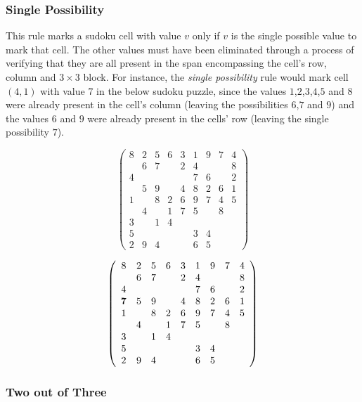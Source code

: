 \documentclass{article}
\begin{document}
\subsubsection{Single Possibility}

This rule marks a sudoku cell with value $v$ only if $v$ is the single possible value to mark that cell. The other values must have been eliminated through a process of verifying that they are all present in the span encompassing the cell's row, column and $3 \times 3$ block. For instance, the {\em single possibility} rule would mark cell $(4,1)$ with value $7$ in the below sudoku puzzle, since the values $1$,$2$,$3$,$4$,$5$ and $8$ were already present in the cell's column (leaving the possibilities $6$,$7$ and $9$) and the values $6$ and $9$ were already present in the cells' row (leaving the single possibility $7$).

\[ \left( \begin{array}{ccccccccc}
8 & 2 & 5 & 6 & 3 & 1 & 9 & 7 & 4 \\
  & 6 & 7 &   & 2 & 4 &   &   & 8 \\
4 &   &   &   &   & 7 & 6 &   & 2 \\
  & 5 & 9 &   & 4 & 8 & 2 & 6 & 1 \\
1 &   & 8 & 2 & 6 & 9 & 7 & 4 & 5 \\
  & 4 &   & 1 & 7 & 5 &   & 8 &   \\
3 &   & 1 & 4 &   &   &   &   &   \\
5 &   &   &   &   & 3 & 4 &   &   \\
2 & 9 & 4 &   &   & 6 & 5 &   &   \end{array}  \right)\]

\[ \left( \begin{array}{ccccccccc}
8 & 2 & 5 & 6 & 3 & 1 & 9 & 7 & 4 \\
  & 6 & 7 &   & 2 & 4 &   &   & 8 \\
4 &   &   &   &   & 7 & 6 &   & 2 \\
{\bf 7} & 5 & 9 &   & 4 & 8 & 2 & 6 & 1 \\
1 &   & 8 & 2 & 6 & 9 & 7 & 4 & 5 \\
  & 4 &   & 1 & 7 & 5 &   & 8 &   \\
3 &   & 1 & 4 &   &   &   &   &   \\
5 &   &   &   &   & 3 & 4 &   &   \\
2 & 9 & 4 &   &   & 6 & 5 &   &   \end{array}  \right)\]

\subsubsection{Two out of Three}
\end{document}
